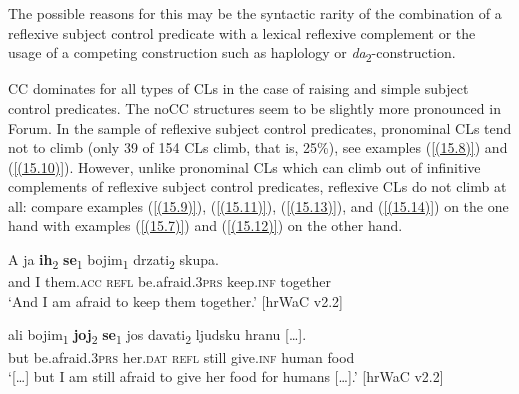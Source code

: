 
\noindent The possible reasons for this may be the syntactic rarity of the combination of a reflexive subject control predicate with a lexical reflexive complement or the usage of a competing construction such as haplology or \textit{da}\textsubscript{2}-construction.

CC dominates for all types of CLs in the case of raising and simple subject control predicates. The noCC structures seem to be slightly more pronounced in Forum. In the sample of reflexive subject control predicates, pronominal CLs tend not to climb (only 39 of 154 CLs climb, that is, 25\%), see examples (\ref{(15.8)}) and (\ref{(15.10)}). However, unlike pronominal CLs which can climb out of infinitive complements of reflexive subject control predicates, reflexive CLs do not climb at all: compare examples (\ref{(15.9)}), (\ref{(15.11)}), (\ref{(15.13)}), and (\ref{(15.14)}) on the one hand with examples (\ref{(15.7)}) and (\ref{(15.12)}) on the other hand.

\begin{exe}\ex\label{(15.13)}
\gll A  ja \textbf{ih}\textsubscript{2} \textbf{se}\textsubscript{1} bojim\textsubscript{1} drzati\textsubscript{2} skupa. \\
and I them.\textsc{acc} \textsc{refl} be.afraid.3\textsc{prs} keep.\textsc{inf} together \\
\glt  ‘And I am afraid to keep them together.’
\hfill [hrWaC v2.2]

\ex\label{(15.14)}
\gll [\dots] ali bojim\textsubscript{1} \textbf{joj}\textsubscript{2} \textbf{se}\textsubscript{1} jos davati\textsubscript{2} ljudsku {hranu [\dots].} \\
{} but be.afraid.3\textsc{prs} her.\textsc{dat} \textsc{refl} still give.\textsc{inf} human food \\
\glt ‘[\dots] but I am still afraid to give her food for humans [\dots].’
\hfill [hrWaC v2.2]
\end{exe}


